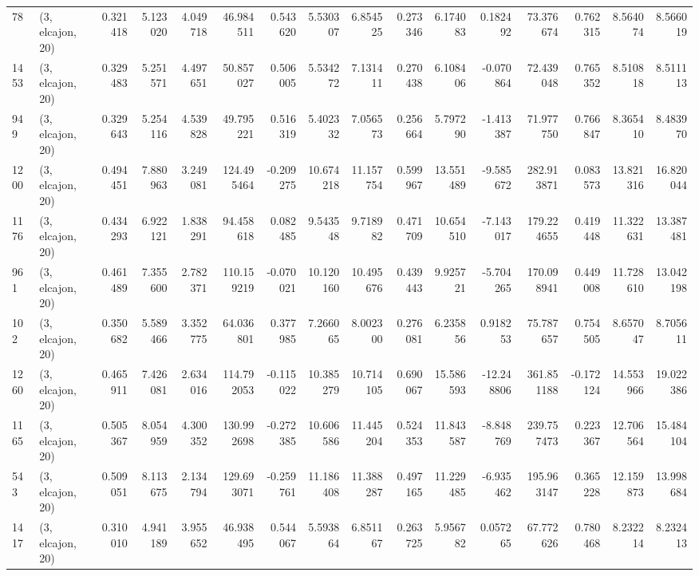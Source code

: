 \begin{tabular}{llrrrrrrrrrrrrrr}
78   &  (3, elcajon, 20) &   0.321418 &   5.123020 &   4.049718 &     46.984511 &    0.543620 &    5.530307 &    6.854525 &  0.273346 &   6.174083 &   0.182492 &    73.376674 &   0.762315 &   8.564074 &   8.566019 \\
1453 &  (3, elcajon, 20) &   0.329483 &   5.251571 &   4.497651 &     50.857027 &    0.506005 &    5.534272 &    7.131411 &  0.270438 &   6.108406 &  -0.070864 &    72.439048 &   0.765352 &   8.510818 &   8.511113 \\
949  &  (3, elcajon, 20) &   0.329643 &   5.254116 &   4.539828 &     49.795221 &    0.516319 &    5.402332 &    7.056573 &  0.256664 &   5.797290 &  -1.413387 &    71.977750 &   0.766847 &   8.365410 &   8.483970 \\
1200 &  (3, elcajon, 20) &   0.494451 &   7.880963 &   3.249081 &    124.495464 &   -0.209275 &   10.674218 &   11.157754 &  0.599967 &  13.551489 &  -9.585672 &   282.913871 &   0.083573 &  13.821316 &  16.820044 \\
1176 &  (3, elcajon, 20) &   0.434293 &   6.922121 &   1.838291 &     94.458618 &    0.082485 &    9.543548 &    9.718982 &  0.471709 &  10.654510 &  -7.143017 &   179.224655 &   0.419448 &  11.322631 &  13.387481 \\
961  &  (3, elcajon, 20) &   0.461489 &   7.355600 &   2.782371 &    110.159219 &   -0.070021 &   10.120160 &   10.495676 &  0.439443 &   9.925721 &  -5.704265 &   170.098941 &   0.449008 &  11.728610 &  13.042198 \\
102  &  (3, elcajon, 20) &   0.350682 &   5.589466 &   3.352775 &     64.036801 &    0.377985 &    7.266065 &    8.002300 &  0.276081 &   6.235856 &   0.918253 &    75.787657 &   0.754505 &   8.657047 &   8.705611 \\
1260 &  (3, elcajon, 20) &   0.465911 &   7.426081 &   2.634016 &    114.792053 &   -0.115022 &   10.385279 &   10.714105 &  0.690067 &  15.586593 & -12.248806 &   361.851188 &  -0.172124 &  14.553966 &  19.022386 \\
1165 &  (3, elcajon, 20) &   0.505367 &   8.054959 &   4.300352 &    130.992698 &   -0.272385 &   10.606586 &   11.445204 &  0.524353 &  11.843587 &  -8.848769 &   239.757473 &   0.223367 &  12.706564 &  15.484104 \\
543  &  (3, elcajon, 20) &   0.509051 &   8.113675 &   2.134794 &    129.693071 &   -0.259761 &   11.186408 &   11.388287 &  0.497165 &  11.229485 &  -6.935462 &   195.963147 &   0.365228 &  12.159873 &  13.998684 \\
1417 &  (3, elcajon, 20) &   0.310010 &   4.941189 &   3.955652 &     46.938495 &    0.544067 &    5.593864 &    6.851167 &  0.263725 &   5.956782 &   0.057265 &    67.772626 &   0.780468 &   8.232214 &   8.232413 \\

\end{tabular}

